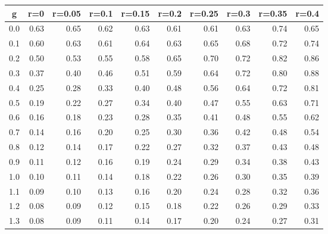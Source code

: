 %
\begin{table}[!tbp]
 \begin{center}
 \begin{tabular}{rrrrrrrrrr}\hline\hline
\multicolumn{1}{c}{g}&\multicolumn{1}{c}{r=0}&\multicolumn{1}{c}{r=0.05}&\multicolumn{1}{c}{r=0.1}&\multicolumn{1}{c}{r=0.15}&\multicolumn{1}{c}{r=0.2}&\multicolumn{1}{c}{r=0.25}&\multicolumn{1}{c}{r=0.3}&\multicolumn{1}{c}{r=0.35}&\multicolumn{1}{c}{r=0.4}\tabularnewline
\hline
0.0&0.63&0.65&0.62&0.63&0.61&0.61&0.63&0.74&0.65\tabularnewline
0.1&0.60&0.63&0.61&0.64&0.63&0.65&0.68&0.72&0.74\tabularnewline
0.2&0.50&0.53&0.55&0.58&0.65&0.70&0.72&0.82&0.86\tabularnewline
0.3&0.37&0.40&0.46&0.51&0.59&0.64&0.72&0.80&0.88\tabularnewline
0.4&0.25&0.28&0.33&0.40&0.48&0.56&0.64&0.72&0.81\tabularnewline
0.5&0.19&0.22&0.27&0.34&0.40&0.47&0.55&0.63&0.71\tabularnewline
0.6&0.16&0.18&0.23&0.28&0.35&0.41&0.48&0.55&0.62\tabularnewline
0.7&0.14&0.16&0.20&0.25&0.30&0.36&0.42&0.48&0.54\tabularnewline
0.8&0.12&0.14&0.17&0.22&0.27&0.32&0.37&0.43&0.48\tabularnewline
0.9&0.11&0.12&0.16&0.19&0.24&0.29&0.34&0.38&0.43\tabularnewline
1.0&0.10&0.11&0.14&0.18&0.22&0.26&0.30&0.35&0.39\tabularnewline
1.1&0.09&0.10&0.13&0.16&0.20&0.24&0.28&0.32&0.36\tabularnewline
1.2&0.08&0.09&0.12&0.15&0.18&0.22&0.26&0.29&0.33\tabularnewline
1.3&0.08&0.09&0.11&0.14&0.17&0.20&0.24&0.27&0.31\tabularnewline
\hline
\end{tabular}

\end{center}

\end{table}

